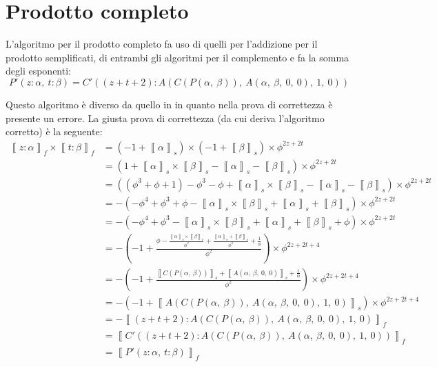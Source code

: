 \documentclass[Lau,oneside]{sapthesis}
\begin{document}
\section{Prodotto completo}
L'algoritmo per il prodotto completo fa uso di quelli per l'addizione per il prodotto semplificati, di entrambi gli algoritmi per il complemento e fa la somma degli esponenti:
$$P'(z:\alpha, \ t:\beta) = C'((z+t+2):A(C(P(\alpha, \ \beta)), \ A(\alpha, \ \beta, \ 0, \ 0), \ 1, \ 0))$$

Questo algoritmo è diverso da quello in \cite{PietroDiGianantonio} in quanto nella prova di correttezza è presente un errore. La giusta prova di correttezza (da cui deriva l'algoritmo corretto) è la seguente:
\begin{align*}
\left\llbracket z:\alpha \right\rrbracket_f \times \left\llbracket t:\beta \right\rrbracket_f & = (-1 + \left\llbracket \alpha \right\rrbracket_s) \times (-1 + \left\llbracket \beta \right\rrbracket_s) \times \phi^{2z+2t}\\
& = (1 + \left\llbracket \alpha \right\rrbracket_s \times \left\llbracket \beta \right\rrbracket_s - \left\llbracket \alpha \right\rrbracket_s - \left\llbracket \beta \right\rrbracket_s) \times \phi^{2z+2t}\\
& = ((\phi^3+\phi+1) - \phi^3 - \phi + \left\llbracket \alpha \right\rrbracket_s \times \left\llbracket \beta \right\rrbracket_s - \left\llbracket \alpha \right\rrbracket_s - \left\llbracket \beta \right\rrbracket_s) \times \phi^{2z+2t}\\
& = -(-\phi^4 + \phi^3 + \phi - \left\llbracket \alpha \right\rrbracket_s \times \left\llbracket \beta \right\rrbracket_s + \left\llbracket \alpha \right\rrbracket_s + \left\llbracket \beta \right\rrbracket_s) \times \phi^{2z+2t}\\
& = -(-\phi^4 + \phi^3 - \left\llbracket \alpha \right\rrbracket_s \times \left\llbracket \beta \right\rrbracket_s + \left\llbracket \alpha \right\rrbracket_s + \left\llbracket \beta \right\rrbracket_s + \phi) \times \phi^{2z+2t}\\[0.5cm]
& = -\left(-1 + \frac{\phi - \frac{\left\llbracket \alpha \right\rrbracket_s \times \left\llbracket \beta \right\rrbracket_s}{\phi^2} + \frac{\left\llbracket \alpha \right\rrbracket_s + \left\llbracket \beta \right\rrbracket_s}{\phi^2} + \frac{1}{\phi}}{\phi^2}\right) \times \phi^{2z+2t+4}\\[0.5cm]
& = -\left(-1 + \frac{\left\llbracket C(P(\alpha, \ \beta)) \right\rrbracket_s + \left\llbracket A(\alpha, \ \beta, \ 0, \ 0) \right\rrbracket_s + \frac{1}{\phi}}{\phi^2}\right) \times \phi^{2z+2t+4}\\[0.5cm]
& = -(-1 + \left\llbracket A(C(P(\alpha, \ \beta)), \ A(\alpha, \ \beta, \ 0, \ 0) , \ 1, \ 0) \right\rrbracket_s) \times \phi^{2z+2t+4}\\
& = -\left\llbracket (z+t+2):A(C(P(\alpha, \ \beta)), \ A(\alpha, \ \beta, \ 0, \ 0), \ 1, \ 0) \right\rrbracket_f\\
& = \left\llbracket C'((z+t+2):A(C(P(\alpha, \ \beta)), \ A(\alpha, \ \beta, \ 0, \ 0), \ 1, \ 0)) \right\rrbracket_f\\
& = \left\llbracket P'(z:\alpha, \ t:\beta) \right\rrbracket_f
\end{align*}
\end{document}
